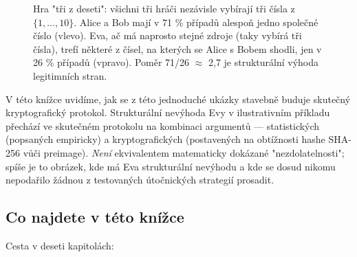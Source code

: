 \documentclass[11pt,a4paper]{article}
\begin{document}
\begin{figure}[h]
\caption{Hra "tři z deseti": všichni tři hráči nezávisle vybírají tři čísla z $\{1, \ldots, 10\}$. Alice a Bob mají v 71 \% případů alespoň jedno společné číslo (vlevo). Eva, ač má naprosto stejné zdroje (taky vybírá tři čísla), trefí některé z čísel, na kterých se Alice s Bobem shodli, jen v 26 \% případů (vpravo). Poměr 71/26 $\approx$ 2{,}7 je strukturální výhoda legitimních stran.}
\label{fig:asymmetry}
\end{figure}

V této knížce uvidíme, jak se z této jednoduché ukázky stavebně buduje skutečný kryptografický protokol. Strukturální nevýhoda Evy v ilustrativním příkladu přechází ve skutečném protokolu na kombinaci argumentů --- statistických (popsaných empiricky) a kryptografických (postavených na obtížnosti hashe SHA-256 vůči preimage). \emph{Není} ekvivalentem matematicky dokázané "nezdolatelnosti"; spíše je to obrázek, kde má Eva strukturální nevýhodu a kde se dosud nikomu nepodařilo žádnou z testovaných útočnických strategií prosadit.

\subsection{Co najdete v této knížce}

Cesta v deseti kapitolách:
\end{document}
